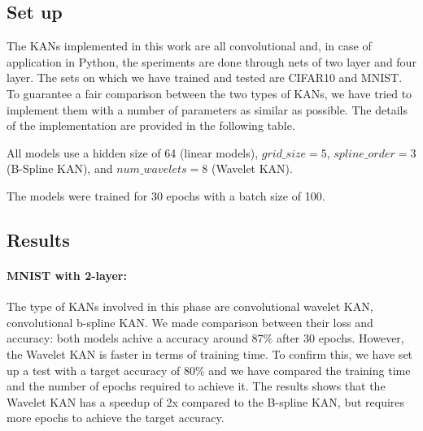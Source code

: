 \documentclass[11pt,a4paper,twocolumn]{article}
\begin{document}
\subsection{Set up}
\label{subsec:Python_set_up}
The KANs implemented in this work are all convolutional and, in case of application in Python, the speriments are done through 
nets of two layer and four layer. The sets on which we have trained and tested are CIFAR10 and MNIST.
To guarantee a fair comparison between the two types of KANs, we have tried to implement them with a number of parameters as similar as possible.
The details of the implementation are provided in the following table.

\begin{table}[htbp]
\centering
\caption{Number of trainable parameters for each KAN model on its corresponding test set.}
\label{tab:model_parameters}
\vspace{0.5em}
\footnotesize
All models use a hidden size of 64 (linear models), $grid\_size=5$, $spline\_order=3$ (B-Spline KAN), and $num\_wavelets=8$ (Wavelet KAN).
\end{table}

The models were trained for 30 epochs with a batch size of 100.

\subsection{Results}
\label{subsec:Python_results}
\paragraph{MNIST with 2-layer:} 
The type of KANs involved in this phase are convolutional wavelet KAN, convolutional b-spline KAN.
We made comparison between their loss and accuracy: both models achive a accuracy around 87\% after 30 epochs.
However, the Wavelet KAN is faster in terms of training time. To confirm this, we have set up a test with a target accuracy of 80\% 
and we have compared the training time and the number of epochs required to achieve it.
The results shows that the Wavelet KAN has a speedup of 2x compared to the B-spline KAN,
but requires more epochs to achieve the target accuracy.
\end{document}
